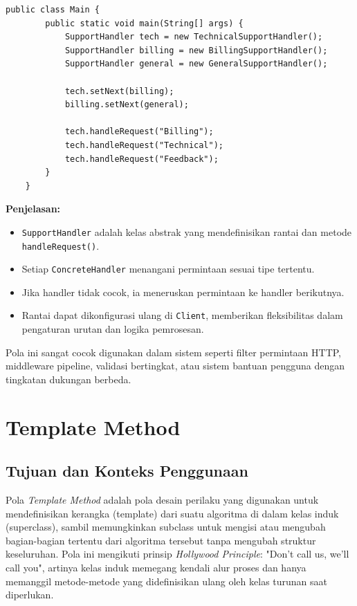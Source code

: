 \begin{lstlisting}[style=JavaStyle, caption={Client: Membentuk Rantai dan Mengirim Permintaan}]
	public class Main {
		public static void main(String[] args) {
			SupportHandler tech = new TechnicalSupportHandler();
			SupportHandler billing = new BillingSupportHandler();
			SupportHandler general = new GeneralSupportHandler();
			
			tech.setNext(billing);
			billing.setNext(general);
			
			tech.handleRequest("Billing");
			tech.handleRequest("Technical");
			tech.handleRequest("Feedback");
		}
	}
\end{lstlisting}

\textbf{Penjelasan:}

\begin{itemize}
	\item \texttt{SupportHandler} adalah kelas abstrak yang mendefinisikan rantai dan metode \texttt{handleRequest()}.
	\item Setiap \texttt{ConcreteHandler} menangani permintaan sesuai tipe tertentu.
	\item Jika handler tidak cocok, ia meneruskan permintaan ke handler berikutnya.
	\item Rantai dapat dikonfigurasi ulang di \texttt{Client}, memberikan fleksibilitas dalam pengaturan urutan dan logika pemrosesan.
\end{itemize}

Pola ini sangat cocok digunakan dalam sistem seperti filter permintaan HTTP, middleware pipeline, validasi bertingkat, atau sistem bantuan pengguna dengan tingkatan dukungan berbeda.



\section{Template Method}
\subsection{Tujuan dan Konteks Penggunaan}

Pola \textit{Template Method} adalah pola desain perilaku yang digunakan untuk mendefinisikan kerangka (template) dari suatu algoritma di dalam kelas induk (superclass), sambil memungkinkan subclass untuk mengisi atau mengubah bagian-bagian tertentu dari algoritma tersebut tanpa mengubah struktur keseluruhan. Pola ini mengikuti prinsip \textit{Hollywood Principle}: "Don't call us, we'll call you", artinya kelas induk memegang kendali alur proses dan hanya memanggil metode-metode yang didefinisikan ulang oleh kelas turunan saat diperlukan.

